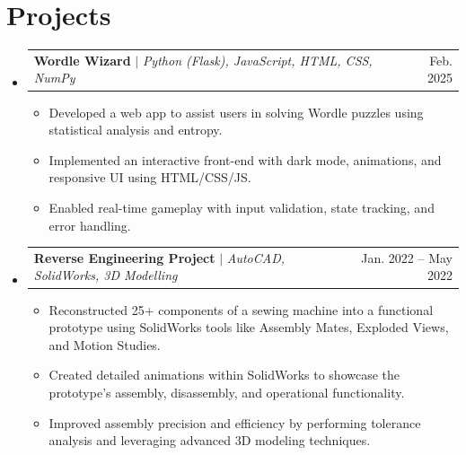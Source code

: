 \documentclass[letterpaper,11pt]{article}
\makeatletter
\newcommand{\resumeItem}[1]{
  \item\small{
    {#1 \vspace{-2pt}}
  }
}
\newcommand{\resumeProjectHeading}[2]{
    \item
    \begin{tabular*}{0.97\textwidth}{l@{\extracolsep{\fill}}r}
      \small#1 & #2 \\
    \end{tabular*}\vspace{-7pt}
}
\newcommand{\resumeSubHeadingListStart}{\begin{itemize}[leftmargin=0.15in, label={}]}
\newcommand{\resumeSubHeadingListEnd}{\end{itemize}}
\newcommand{\resumeItemListStart}{\begin{itemize}}
\newcommand{\resumeItemListEnd}{\end{itemize}\vspace{-5pt}}
\makeatother
\begin{document}
\section{Projects}
    \resumeSubHeadingListStart
      \resumeProjectHeading
          {\textbf{Wordle Wizard} $|$ \emph{Python (Flask), JavaScript, HTML, CSS, NumPy}}{Feb. 2025}
          \resumeItemListStart
            \resumeItem{Developed a web app to assist users in solving Wordle puzzles using statistical analysis and entropy.}
            \resumeItem{Implemented an interactive front-end with dark mode, animations, and responsive UI using HTML/CSS/JS.}
            \resumeItem{Enabled real-time gameplay with input validation, state tracking, and error handling.}
          \resumeItemListEnd
      \resumeProjectHeading
          {\textbf{Reverse Engineering Project} $|$ \emph{AutoCAD, SolidWorks, 3D Modelling}}{Jan. 2022 -- May 2022}
          \resumeItemListStart
            \resumeItem{Reconstructed 25+ components of a sewing machine into a functional prototype using SolidWorks tools like Assembly Mates, Exploded Views, and Motion Studies.}
            \resumeItem{Created detailed animations within SolidWorks to showcase the prototype’s assembly, disassembly, and operational functionality.}
            \resumeItem{Improved assembly precision and efficiency by performing tolerance analysis and leveraging advanced 3D modeling techniques.}
          \resumeItemListEnd
    \resumeSubHeadingListEnd





    
    

\end{document}
